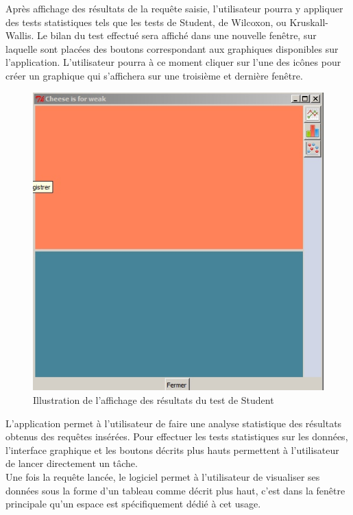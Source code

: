 \documentclass[a4paper,10pt]{report}
\begin{document}
Après affichage des résultats de la requête saisie, l'utilisateur pourra y appliquer des tests statistiques tels que les tests de Student, de Wilcoxon, ou Kruskall-Wallis. Le bilan du test effectué sera affiché dans une nouvelle fenêtre, sur laquelle sont placées des boutons correspondant aux graphiques disponibles sur l'application. L'utilisateur pourra à ce moment cliquer sur l'une des icônes pour créer un graphique qui s'affichera sur une troisième et dernière fenêtre.

\begin{figure}[H]

\centering
\includegraphics[scale=0.6]{test.jpg}
\caption{Illustration de l'affichage des résultats du test de Student}

\end{figure} 

L'application permet à l'utilisateur de faire une analyse  statistique des résultats obtenus des requêtes insérées. Pour effectuer les tests statistiques sur les données, l'interface graphique et les boutons décrits plus hauts permettent à l'utilisateur de lancer directement un tâche. \\

Une fois la requête lancée, le logiciel permet à l'utilisateur de visualiser ses données sous la forme d'un tableau comme décrit plus haut, c'est dans la fenêtre principale qu'un espace est spécifiquement dédié à cet usage.
\end{document}
